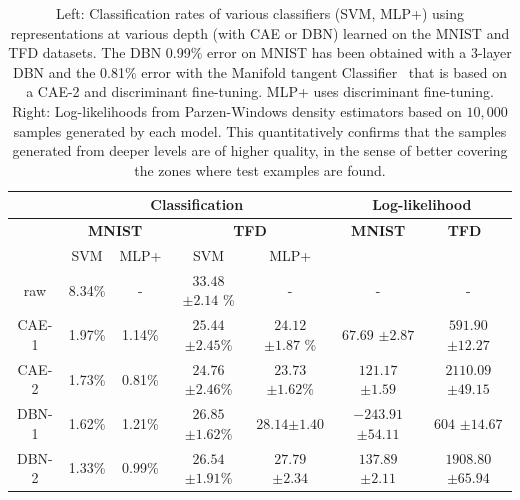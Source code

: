 \begin{table}[!htbp]
\begin{small}
 \begin{center}
\begin{tabular}{c|c|c||c|c||c|c|}
& \multicolumn{4}{|c||}{\bf Classification} & \multicolumn{2}{|c|}{\bf Log-likelihood}  \\ \hline
& \multicolumn{2}{|c||}{\bf MNIST} & \multicolumn{2}{c||}{\bf TFD} & \multicolumn{1}{|c|}{\bf MNIST} & \multicolumn{1}{c|}{\bf $\,\,\,$TFD $\,\,\,\,$}\\
& SVM &  MLP+ & SVM  & MLP+ & & \\ \hline
raw   & 8.34\%  & -      & $33.48$ {\scriptsize $\pm 2.14$ }\% & - & - & - \\ \hline
CAE-1 & 1.97\%  & 1.14\% & $25.44$ {\scriptsize $ \pm2.45$}\% & $24.12$ {\scriptsize $\pm1.87$} \% & $ 67.69$ {\scriptsize $\pm2.87$} & $591.90$ {\scriptsize $\pm12.27$}\\
CAE-2 & 1.73\%  & 0.81\% & $24.76$ {\scriptsize $\pm2.46$}\% & $23.73$ {\scriptsize $\pm1.62$}\% & $121.17$ {\scriptsize $\pm1.59$} & $2110.09$ {\scriptsize $\pm49.15$}\\ \hline
DBN-1 & 1.62\%  & 1.21\% & $26.85$ {\scriptsize $\pm1.62$}\% & $28.14${\scriptsize $\pm1.40 $}  & $-243.91$ {\scriptsize $\pm54.11$} &  $604$ {\scriptsize $\pm14.67$} \\
DBN-2 & 1.33\%  & 0.99\% & $26.54$ {\scriptsize $\pm1.91$}\% & $27.79$ {\scriptsize $\pm2.34$}& $137.89$ {\scriptsize $\pm2.11$} & $1908.80$ {\scriptsize $\pm65.94$}\\\hline
\end{tabular}

\caption[Classification rates on MNIST and TFD]{Left: Classification rates of various classifiers (SVM, MLP+)
  using representations at various depth (with CAE or DBN)
  learned on the MNIST and TFD datasets.  The DBN 0.99\% error on
  MNIST has been obtained with a 3-layer DBN and the 0.81\% error
  with the Manifold tangent
  Classifier~\citep{Dauphin-et-al-NIPS2011} that is based on a
  CAE-2 and discriminant fine-tuning. MLP+ uses discriminant
  fine-tuning. Right: Log-likelihoods from Parzen-Windows density
  estimators based on $10,000$ samples generated by each model. This
  quantitatively confirms that the samples generated from deeper
  levels are of higher quality, in the sense of better covering the
  zones where test examples are found.}
\label{tab:res-knn-svm}

\end{center}
\end{small}
\end{table}

